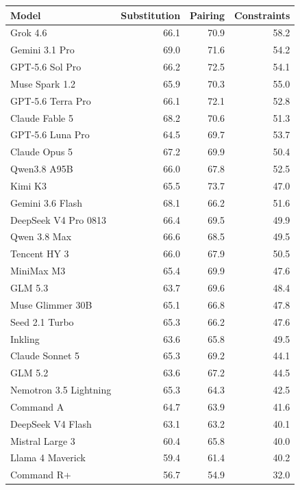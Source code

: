 \begin{tabular}{@{}l r r r@{}}
\toprule
Model & Substitution & Pairing & Constraints \\
\midrule
Grok 4.6 & 66.1 & 70.9 & 58.2 \\
Gemini 3.1 Pro & 69.0 & 71.6 & 54.2 \\
GPT-5.6 Sol Pro & 66.2 & 72.5 & 54.1 \\
Muse Spark 1.2 & 65.9 & 70.3 & 55.0 \\
GPT-5.6 Terra Pro & 66.1 & 72.1 & 52.8 \\
Claude Fable 5 & 68.2 & 70.6 & 51.3 \\
GPT-5.6 Luna Pro & 64.5 & 69.7 & 53.7 \\
Claude Opus 5 & 67.2 & 69.9 & 50.4 \\
Qwen3.8 A95B & 66.0 & 67.8 & 52.5 \\
Kimi K3 & 65.5 & 73.7 & 47.0 \\
Gemini 3.6 Flash & 68.1 & 66.2 & 51.6 \\
DeepSeek V4 Pro 0813 & 66.4 & 69.5 & 49.9 \\
Qwen 3.8 Max & 66.6 & 68.5 & 49.5 \\
Tencent HY 3 & 66.0 & 67.9 & 50.5 \\
MiniMax M3 & 65.4 & 69.9 & 47.6 \\
GLM 5.3 & 63.7 & 69.6 & 48.4 \\
Muse Glimmer 30B & 65.1 & 66.8 & 47.8 \\
Seed 2.1 Turbo & 65.3 & 66.2 & 47.6 \\
Inkling & 63.6 & 65.8 & 49.5 \\
Claude Sonnet 5 & 65.3 & 69.2 & 44.1 \\
GLM 5.2 & 63.6 & 67.2 & 44.5 \\
Nemotron 3.5 Lightning & 65.3 & 64.3 & 42.5 \\
Command A & 64.7 & 63.9 & 41.6 \\
DeepSeek V4 Flash & 63.1 & 63.2 & 40.1 \\
Mistral Large 3 & 60.4 & 65.8 & 40.0 \\
Llama 4 Maverick & 59.4 & 61.4 & 40.2 \\
Command R+ & 56.7 & 54.9 & 32.0 \\
\bottomrule
\end{tabular}
